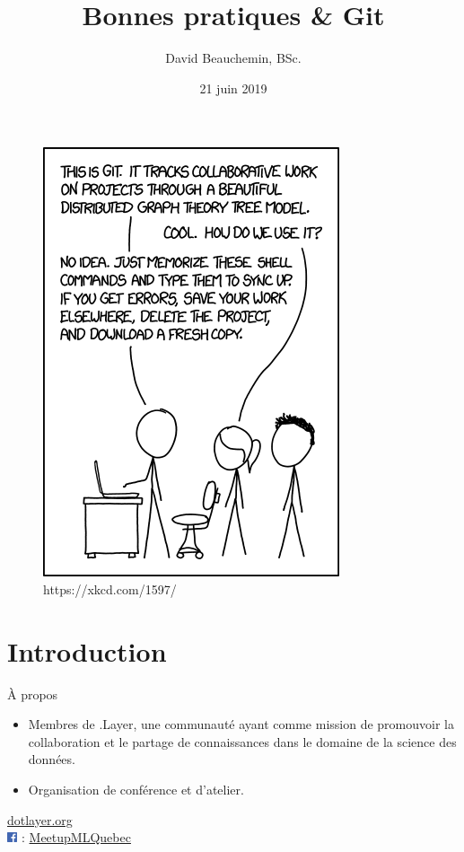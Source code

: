 \documentclass[11pt]{beamer}
\title[Atelier pratique Git]{Bonnes pratiques \& Git}
\author[D. Beauchemin]{David Beauchemin, BSc.}
\institute[.Layer]
{
.Layer, Université Laval, CRDM, GRAAL
}
\date{21 juin 2019}
\begin{document}
\begin{frame}[label=titre, plain]
	\titlepage
\end{frame}

\begin{frame}
	\begin{center}
		\begin{figure}
			\includegraphics[width=0.75\linewidth,height=0.75\textheight,keepaspectratio]{git}
			\caption{https://xkcd.com/1597/}
		\end{figure}
	\end{center}
\end{frame}


\section[Introduction]{Introduction}


\begin{frame}{À propos}
	\begin{itemize}
		\item Membres de .Layer, une communauté ayant comme mission de promouvoir la collaboration et le partage de connaissances dans le domaine de la science des données.
		\item Organisation de conférence et d'atelier. 
	\end{itemize}
	\begin{center}
		\href{dotlayer.org}{dotlayer.org}\\
		\includegraphics[height = 0.3cm]{facebook} : \href{https://www.facebook.com/MeetupMLQuebec/}{MeetupMLQuebec}
	\end{center}
\end{frame}
\end{document}
